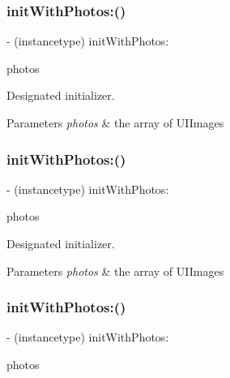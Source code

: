 \subsubsection{\texorpdfstring{init\+With\+Photos\+:()}{initWithPhotos:()}\hspace{0.1cm}{\footnotesize\ttfamily [1/5]}}
{\footnotesize\ttfamily -\/ (instancetype) init\+With\+Photos\+: \begin{DoxyParamCaption}\item[{(N\+S\+Array $\ast$)}]{photos }\end{DoxyParamCaption}}

Designated initializer. 
\begin{DoxyParams}{Parameters}
{\em photos} & the array of U\+I\+Images \\
\hline
\end{DoxyParams}
\mbox{\label{interfaceFBPhotoParams_aa20322b48f3dc61260103228cab4dc33}} 
\subsubsection{\texorpdfstring{init\+With\+Photos\+:()}{initWithPhotos:()}\hspace{0.1cm}{\footnotesize\ttfamily [2/5]}}
{\footnotesize\ttfamily -\/ (instancetype) init\+With\+Photos\+: \begin{DoxyParamCaption}\item[{(N\+S\+Array $\ast$)}]{photos }\end{DoxyParamCaption}}

Designated initializer. 
\begin{DoxyParams}{Parameters}
{\em photos} & the array of U\+I\+Images \\
\hline
\end{DoxyParams}
\mbox{\label{interfaceFBPhotoParams_aa20322b48f3dc61260103228cab4dc33}} 
\subsubsection{\texorpdfstring{init\+With\+Photos\+:()}{initWithPhotos:()}\hspace{0.1cm}{\footnotesize\ttfamily [3/5]}}
{\footnotesize\ttfamily -\/ (instancetype) init\+With\+Photos\+: \begin{DoxyParamCaption}\item[{(N\+S\+Array $\ast$)}]{photos }\end{DoxyParamCaption}}

